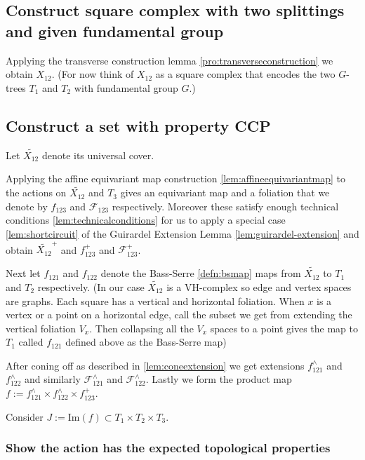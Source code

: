 \documentclass[12pt,parskip=full]{report}
\theoremstyle{plain}
\theoremstyle{definition}
\begin{document}
\subsection{Construct square complex with two splittings and given fundamental group}

Applying the transverse construction lemma \ref{pro:transverseconstruction} we obtain \(X_{12}\). (For now think of $X_{12}$ as a square complex that encodes the two $G$-trees $T_1$ and $T_2$ with fundamental group $G$.) 

\subsection{Construct a set with property CCP}

Let \(\widetilde {X_{12}}\) denote its universal cover. 
        
        Applying the affine equivariant map construction \ref{lem:affineequivariantmap} to the actions on \(\widetilde {X_{12}}\) and \(T_{3}\) gives an equivariant  map and a foliation that we denote by \(f_{123}\) and \(\mathscr{F}_{123}\) respectively. Moreover these satisfy enough technical conditions 
        \ref{lem:technicalconditions} for us to apply a special case \ref{lem:shortcircuit} of the Guirardel Extension Lemma \ref{lem:guirardel-extension} and obtain \(\widetilde{X_{12}}^{+}\) and \(f_{123}^{+}\) and \(\mathscr{F}_{123}^{+}\).

        Next let  \(f_{121}\) and  \(f_{122}\)  denote the Bass-Serre \ref{defn:bsmap} maps from \(\widetilde {X_{12}}\) to \(T_{1}\) and \(T_{2}\) respectively. (In our case \(\widetilde {X_{12}}\) is a VH-complex so edge and vertex spaces are graphs. Each square has a vertical and horizontal foliation. When $x$ is a vertex or a point on a horizontal edge, call the subset we get from extending the vertical foliation $V_x$. Then collapsing all the $V_x$ spaces to a point gives the map to $T_1$ called \(f_{121}\) defined above as the Bass-Serre map)
        
        After coning off as described in \ref{lem:coneextension} we get extensions \(f_{121}^{\wedge}\) and \(f_{122}^{\wedge}\) and similarly \(\mathscr{F}^{\wedge}_{121}\) and \(\mathscr{F}^{\wedge}_{122}\). Lastly we form the product map \(f:= f_{121}^{\wedge} \times f_{122}^{\wedge} \times f_{123}^{+}\). 
        
        Consider \(J := \text{Im}(f) \subset T_1\times T_2\times T_3\).
        
\subsubsection{Show the action has the expected topological properties}
\end{document}
